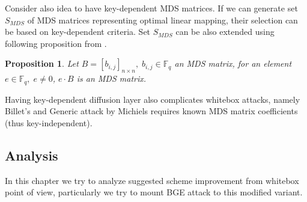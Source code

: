 \documentclass[11pt,oneside,final]{fithesis2}
\newtheorem{myprop}{Proposition}
\begin{document}
    \begin{figure}
    \begin{center}
    \leavevmode
    \centerline{}
    \end{center}
    \caption{}
    \label{fig:aes_mds}
    \end{figure}
    
    Consider also idea to have key-dependent MDS matrices. If we can generate set $S_{MDS}$ of MDS matrices representing optimal linear mapping, their selection 
    can be based on key-dependent criteria. Set $S_{MDS}$ can be also extended using following proposition from \citep{journals/iacr/MalikN11}.

    \begin{myprop}
	Let $B = \left[b_{i,j} \right]_{n \times n},\; b_{i,j} \in \mathbb{F}_q$ an MDS matrix, for an element $e \in \mathbb{F}_q, \; e \neq 0$, $e \cdot B$ is an MDS matrix.
    \end{myprop}
    
    Having key-dependent diffusion layer also complicates whitebox attacks, namely Billet's \citep{Billet:2004:CWB:2080787.2080809} and 
    Generic attack by Michiels \citep{Michiels:2007:MST:1314276.1314291} requires known MDS matrix coefficients (thus key-independent).    
    
    \subsection{Analysis}
    In this chapter we try to analyze suggested scheme improvement from whitebox point of view, particularly we try to mount BGE attack to this modified variant. 
\end{document}
